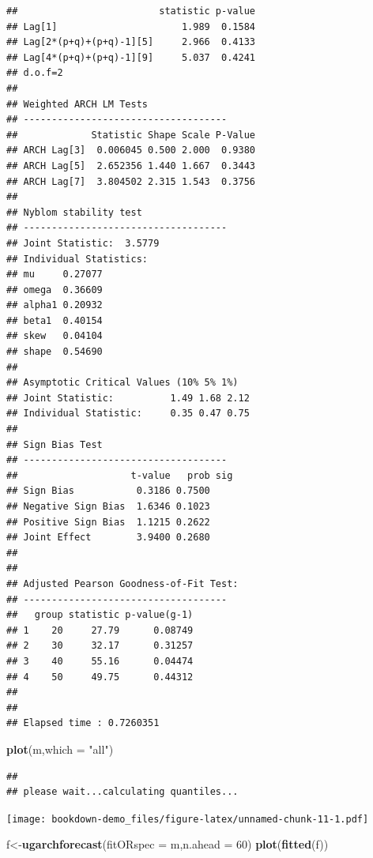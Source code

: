 \documentclass[
  12pt,
  a4paper,
  openany]{book}
\newenvironment{Shaded}{\begin{snugshade}}{\end{snugshade}}
\newcommand{\DataTypeTok}[1]{\textcolor[rgb]{0.13,0.29,0.53}{#1}}
\newcommand{\DecValTok}[1]{\textcolor[rgb]{0.00,0.00,0.81}{#1}}
\newcommand{\KeywordTok}[1]{\textcolor[rgb]{0.13,0.29,0.53}{\textbf{#1}}}
\newcommand{\NormalTok}[1]{#1}
\newcommand{\StringTok}[1]{\textcolor[rgb]{0.31,0.60,0.02}{#1}}
\begin{document}
\begin{verbatim}
##                         statistic p-value
## Lag[1]                      1.989  0.1584
## Lag[2*(p+q)+(p+q)-1][5]     2.966  0.4133
## Lag[4*(p+q)+(p+q)-1][9]     5.037  0.4241
## d.o.f=2
## 
## Weighted ARCH LM Tests
## ------------------------------------
##             Statistic Shape Scale P-Value
## ARCH Lag[3]  0.006045 0.500 2.000  0.9380
## ARCH Lag[5]  2.652356 1.440 1.667  0.3443
## ARCH Lag[7]  3.804502 2.315 1.543  0.3756
## 
## Nyblom stability test
## ------------------------------------
## Joint Statistic:  3.5779
## Individual Statistics:              
## mu     0.27077
## omega  0.36609
## alpha1 0.20932
## beta1  0.40154
## skew   0.04104
## shape  0.54690
## 
## Asymptotic Critical Values (10% 5% 1%)
## Joint Statistic:          1.49 1.68 2.12
## Individual Statistic:     0.35 0.47 0.75
## 
## Sign Bias Test
## ------------------------------------
##                    t-value   prob sig
## Sign Bias           0.3186 0.7500    
## Negative Sign Bias  1.6346 0.1023    
## Positive Sign Bias  1.1215 0.2622    
## Joint Effect        3.9400 0.2680    
## 
## 
## Adjusted Pearson Goodness-of-Fit Test:
## ------------------------------------
##   group statistic p-value(g-1)
## 1    20     27.79      0.08749
## 2    30     32.17      0.31257
## 3    40     55.16      0.04474
## 4    50     49.75      0.44312
## 
## 
## Elapsed time : 0.7260351
\end{verbatim}

\begin{Shaded}
\begin{Highlighting}[]
\KeywordTok{plot}\NormalTok{(m,}\DataTypeTok{which =} \StringTok{"all"}\NormalTok{)}
\end{Highlighting}
\end{Shaded}

\begin{verbatim}
## 
## please wait...calculating quantiles...
\end{verbatim}

\texttt{[image: bookdown-demo\_files/figure-latex/unnamed-chunk-11-1.pdf]}

\begin{Shaded}
\begin{Highlighting}[]
\NormalTok{f\textless{}{-}}\KeywordTok{ugarchforecast}\NormalTok{(}\DataTypeTok{fitORspec =}\NormalTok{ m,}\DataTypeTok{n.ahead =} \DecValTok{60}\NormalTok{)}
\KeywordTok{plot}\NormalTok{(}\KeywordTok{fitted}\NormalTok{(f))}
\end{Highlighting}
\end{Shaded}
\end{document}
